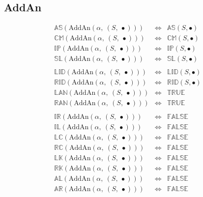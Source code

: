 \documentclass[10pt]{report}
\newcommand{\propname}[1]{{\mathbb{#1}}}
\begin{document}
\subsection{AddAn} 

\[
\begin{array}{rcl} 
\propname{AS}(\mathrm{AddAn}(\alpha,\ (S,\ \bullet))) 
  & \Leftrightarrow
  & \propname{AS}(S, \bullet) \\
\propname{CM}(\mathrm{AddAn}(\alpha,\ (S,\ \bullet))) 
  & \Leftrightarrow
  & \propname{CM}(S, \bullet) \\
\propname{IP}(\mathrm{AddAn}(\alpha,\ (S,\ \bullet))) 
  & \Leftrightarrow
  & \propname{IP}(S, \bullet) \\
\propname{SL}(\mathrm{AddAn}(\alpha,\ (S,\ \bullet))) 
  & \Leftrightarrow
  & \propname{SL}(S, \bullet) \\\\
  
\propname{LID}(\mathrm{AddAn}(\alpha,\ (S,\ \bullet))) 
  & \Leftrightarrow
  & \propname{LID}(S, \bullet) \\
\propname{RID}(\mathrm{AddAn}(\alpha,\ (S,\ \bullet))) 
  & \Leftrightarrow
  & \propname{RID}(S, \bullet) \\
\propname{LAN}(\mathrm{AddAn}(\alpha,\ (S,\ \bullet))) 
  & \Leftrightarrow
  & \propname{TRUE} \\ 
\propname{RAN}(\mathrm{AddAn}(\alpha,\ (S,\ \bullet))) 
  & \Leftrightarrow
  & \propname{TRUE} \\\\
  
\propname{IR}(\mathrm{AddAn}(\alpha,\ (S,\ \bullet))) 
  & \Leftrightarrow
  & \propname{FALSE}\\ 
\propname{IL}(\mathrm{AddAn}(\alpha,\ (S,\ \bullet))) 
  & \Leftrightarrow
  & \propname{FALSE}\\ 
\propname{LC}(\mathrm{AddAn}(\alpha,\ (S,\ \bullet))) 
  & \Leftrightarrow
  & \propname{FALSE}\\ 
\propname{RC}(\mathrm{AddAn}(\alpha,\ (S,\ \bullet))) 
  & \Leftrightarrow
  & \propname{FALSE}\\ 
\propname{LK}(\mathrm{AddAn}(\alpha,\ (S,\ \bullet))) 
  & \Leftrightarrow 
  & \propname{FALSE}\\ 
\propname{RK}(\mathrm{AddAn}(\alpha,\ (S,\ \bullet))) 
  & \Leftrightarrow
  & \propname{FALSE}\\ 
\propname{AL}(\mathrm{AddAn}(\alpha,\ (S,\ \bullet))) 
  & \Leftrightarrow
  & \propname{FALSE}\\ 
\propname{AR}(\mathrm{AddAn}(\alpha,\ (S,\ \bullet))) 
  & \Leftrightarrow
  & \propname{FALSE}\\ 
\end{array} 
\] 
\end{document}
